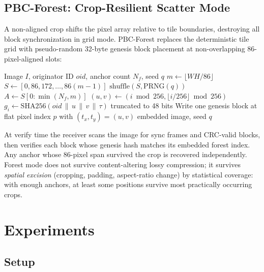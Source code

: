 \documentclass[conference]{IEEEtran}
\begin{document}
\subsection{PBC-Forest: Crop-Resilient Scatter Mode}

A non-aligned crop shifts the pixel array relative to tile boundaries,
destroying all block synchronization in grid mode. PBC-Forest replaces
the deterministic tile grid with pseudo-random 32-byte genesis block
placement at non-overlapping 86-pixel-aligned slots:

\begin{algorithm}[t]
  \caption{PBC-Forest Encode}
  \label{alg:forest}
  \begin{algorithmic}[1]
    \REQUIRE Image $I$, originator ID $\mathit{oid}$, anchor count $N_f$, seed $q$
    \STATE $m \leftarrow \lfloor WH / 86 \rfloor$
    \STATE $S \leftarrow [0, 86, 172, \ldots, 86(m{-}1)]$
    \STATE $\mathrm{shuffle}(S, \mathrm{PRNG}(q))$
    \STATE $A \leftarrow S[0:\min(N_f,m)]$ 
      \STATE $(u,v) \leftarrow (i \bmod 256, \lfloor i/256 \rfloor \bmod 256)$
      \STATE $g_i \leftarrow \mathrm{SHA256}(\mathit{oid}\,\|\,u\,\|\,v\,\|\,\tau)$ truncated to 48 bits
      \STATE Write one genesis block at flat pixel index $p$ with $(t_x,t_y)=(u,v)$
    \ENDFOR
    \RETURN embedded image, seed $q$
  \end{algorithmic}
\end{algorithm}

At verify time the receiver scans the image for sync frames and
CRC-valid blocks, then verifies each block whose genesis hash matches
its embedded forest index. Any anchor whose 86-pixel span survived the
crop is recovered independently.
Forest mode does not survive content-altering lossy compression; it
survives \emph{spatial excision} (cropping, padding, aspect-ratio
change) by statistical coverage: with enough anchors, at least some
positions survive most practically occurring crops.

\section{Experiments}
\label{sec:experiments}

\subsection{Setup}
\end{document}
